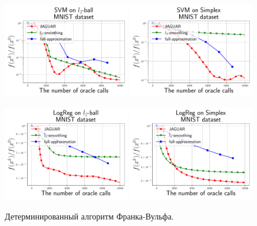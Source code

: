     \begin{figure}[H]
        \centering
        \includegraphics[width=0.49\textwidth]{figures/None_stochastics_FW_SVM_L2_MNIST.pdf}
        \includegraphics[width=0.49\textwidth]{figures/None_stochastics_FW_SVM_Simplex_MNIST.pdf}

        \includegraphics[width=0.49\textwidth]{figures/None_stochastics_FW_LogReg_L2_MNIST.pdf}
        \includegraphics[width=0.49\textwidth]{figures/None_stochastics_FW_LogReg_Simplex_MNIST.pdf}
        
        \caption{Детерминированный алгоритм Франка-Вульфа.}
        \label{fig:FW_determ}
    \end{figure}

